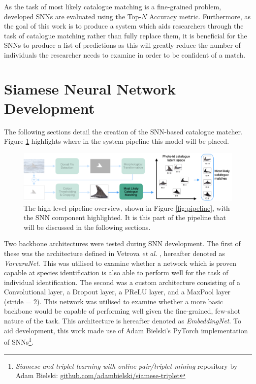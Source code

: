 As the task of most likely catalogue matching is a fine-grained problem, developed SNNs are evaluated using the Top-$N$ Accuracy metric. Furthermore, as the goal of this work is to produce a system which aids researchers through the task of catalogue matching rather than fully replace them, it is beneficial for the SNNs to produce a list of predictions as this will greatly reduce the number of individuals the researcher needs to examine in order to be confident of a match.

\section{Siamese Neural Network Development}\label{ch:ID,sec:SNNDevelopment}

The following sections detail the creation of the SNN-based catalogue matcher. Figure \ref{fig:pipeline-SNN} highlights where in the system pipeline this model will be placed.

\begin{figure}[!h]
	\begin{center}
		\includegraphics[width=\linewidth]{Chapter5/figs/pipeline-SNN.png}
	\end{center}
	\caption[The high level pipeline overview, shown in Figure \ref{fig:pipeline}, with the SNN component highlighted.]{The high level pipeline overview, shown in Figure \ref{fig:pipeline}, with the SNN component highlighted. It is this part of the pipeline that will be discussed in the following sections.}
	\label{fig:pipeline-SNN}
\end{figure}

Two backbone architectures were tested during SNN development. The first of these was the architecture defined in Vetrova \textit{et al.} \cite{vetrova_hidden_2018}, hereafter denoted as \textit{VarvaraNet}. This was utilised to examine whether a network which is proven capable at species identification is also able to perform well for the task of individual identification. The second was a custom architecture consisting of a Convolutional layer, a Dropout layer, a PReLU layer, and a MaxPool layer (stride = 2). This network was utilised to examine whether a more basic backbone would be capable of performing well given the fine-grained, few-shot nature of the task. This architecture is hereafter denoted as \textit{EmbeddingNet}. To aid development, this work made use of Adam Bielski's PyTorch implementation of SNNs\footnote{\textit{Siamese and triplet learning with online pair/triplet mining} repository by Adam Bielski: \href{https://github.com/adambielski/siamese-triplet}{github.com/adambielski/siamese-triplet}}.


